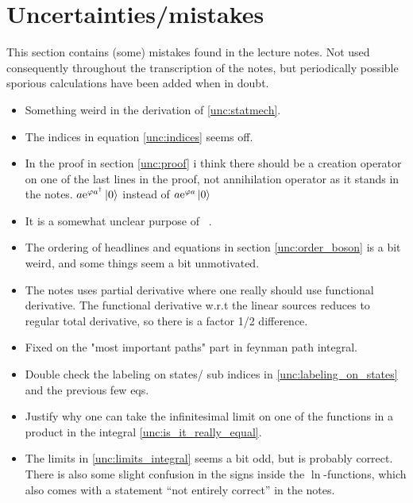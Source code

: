 \section{Uncertainties/mistakes}
This section contains (some) mistakes found in the lecture notes. Not used consequently throughout the transcription of the notes, but periodically possible sporious calculations have been added when in doubt.
\begin{itemize}
\item Something weird in the derivation of \eqref{unc:statmech}.
\item The indices in equation \eqref{unc:indices} seems off.  
\item In the proof in section \ref{unc:proof} i think there should be a creation operator on one of the last lines in the proof, not annihilation operator as it stands in the notes. $a\mathrm{e}^{\varphi a^\dagger}\ket{0}$ instead of $a\mathrm{e}^{\varphi a}\ket{0}$
\item It is a somewhat unclear purpose of ~. 
\item The ordering of headlines and equations in section \ref{unc:order_boson} is a bit weird, and some things seem a bit unmotivated. 
\item The notes uses partial derivative where one really should use functional derivative. The functional derivative w.r.t the linear sources reduces to regular total derivative, so there is a factor 1/2 difference. 
\item Fixed on the "most important paths" part in feynman path integral. 
\item Double check the labeling on states/ sub indices in \eqref{unc:labeling_on_states} and the previous few eqs. 
\item Justify why one can take the infinitesimal limit on one of the functions in a product in the integral \eqref{unc:is_it_really_equal}.
\item The limits in \eqref{unc:limits_integral} seems a bit odd, but is probably correct. There is also some slight confusion in the signs inside the \(\ln\)-functions, which also comes with a statement ``not entirely correct'' in the notes.

\end{itemize}